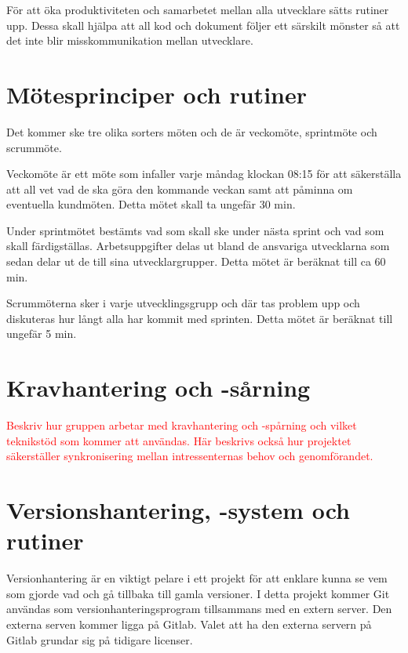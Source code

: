 \documentclass[a4paper,12pt,oneside,final]{extbook}
\begin{document}
För att öka produktiviteten och samarbetet mellan alla utvecklare sätts rutiner upp. Dessa skall hjälpa att all kod och dokument följer ett särskilt mönster så att det inte blir misskommunikation mellan utvecklare.

\section{Mötesprinciper och rutiner}

Det kommer ske tre olika sorters möten och de är veckomöte, sprintmöte och scrummöte.  

Veckomöte är ett möte som infaller varje måndag klockan 08:15 för att säkerställa att all vet vad de ska göra den kommande veckan samt att påminna om eventuella kundmöten. Detta mötet skall ta ungefär 30 min.

Under sprintmötet bestämts vad som skall ske under nästa sprint och vad som skall färdigställas. Arbetsuppgifter delas ut bland de ansvariga utvecklarna som sedan delar ut de till sina utvecklargrupper. Detta mötet är beräknat till ca 60 min.

Scrummöterna sker i varje utvecklingsgrupp och där tas problem upp och diskuteras hur långt alla har kommit med sprinten.  Detta mötet är beräknat till ungefär 5 min.

\section{Kravhantering och -sårning}

\textcolor{red}{Beskriv hur gruppen arbetar med kravhantering och -spårning och vilket teknikstöd som kommer att
användas.}
\textcolor{red}{Här beskrivs också hur projektet säkerställer synkronisering mellan intressenternas behov och genomförandet.}


\section{Versionshantering, -system och rutiner}
Versionhantering är en viktigt pelare i ett projekt för att enklare kunna se vem som gjorde vad och gå tillbaka till gamla versioner. I detta projekt kommer Git användas som versionhanteringsprogram tillsammans med en extern server. Den externa serven kommer ligga på Gitlab. Valet att ha den externa servern på Gitlab grundar sig på tidigare licenser.
\end{document}
